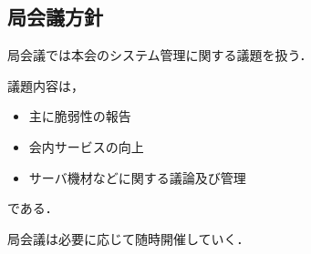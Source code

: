 \subsection*{局会議方針}


局会議では本会のシステム管理に関する議題を扱う．

議題内容は，
\begin{itemize}
    \item 主に脆弱性の報告
    \item 会内サービスの向上
    \item サーバ機材などに関する議論及び管理
\end{itemize}    
である．

局会議は必要に応じて随時開催していく．
